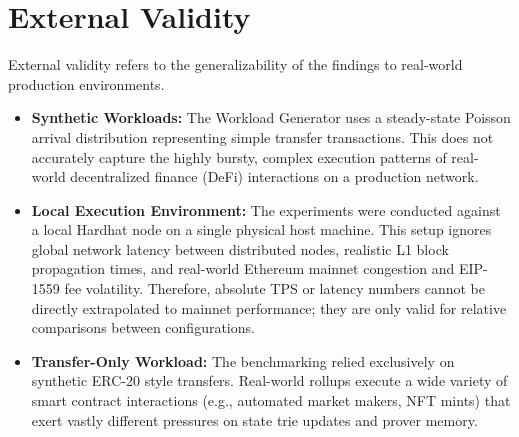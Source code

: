 \section{External Validity}
\label{sec:external_validity}
External validity refers to the generalizability of the findings to real-world production environments.
\begin{itemize}
    \item \textbf{Synthetic Workloads:} The Workload Generator uses a steady-state Poisson arrival distribution representing simple transfer transactions. This does not accurately capture the highly bursty, complex execution patterns of real-world decentralized finance (DeFi) interactions on a production network.
    \item \textbf{Local Execution Environment:} The experiments were conducted against a local Hardhat node on a single physical host machine. This setup ignores global network latency between distributed nodes, realistic L1 block propagation times, and real-world Ethereum mainnet congestion and EIP-1559 fee volatility. Therefore, absolute TPS or latency numbers cannot be directly extrapolated to mainnet performance; they are only valid for relative comparisons between configurations.
    \item \textbf{Transfer-Only Workload:} The benchmarking relied exclusively on synthetic ERC-20 style transfers. Real-world rollups execute a wide variety of smart contract interactions (e.g., automated market makers, NFT mints) that exert vastly different pressures on state trie updates and prover memory.
\end{itemize}